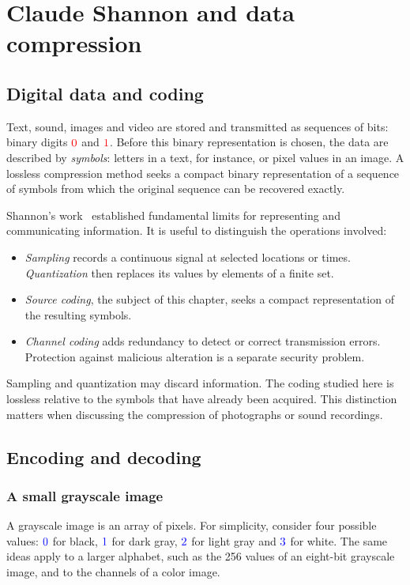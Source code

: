\chapter{Claude Shannon and data compression}
\label{chap-shannon}

\section{Digital data and coding}
Text, sound, images and video are stored and transmitted as sequences of bits: binary digits ${\color{red}{0}}$ and ${\color{red}{1}}$. Before this binary representation is chosen, the data are described by \emph{symbols}: letters in a text, for instance, or pixel values in an image. A lossless compression method seeks a compact binary representation of a sequence of symbols from which the original sequence can be recovered exactly.

Shannon's work~\cite{Shannon1948,shannon1949} established fundamental limits for representing and communicating information. It is useful to distinguish the operations involved:
\begin{itemize}
\item \emph{Sampling} records a continuous signal at selected locations or times. \emph{Quantization} then replaces its values by elements of a finite set.
\item \emph{Source coding}, the subject of this chapter, seeks a compact representation of the resulting symbols.
\item \emph{Channel coding} adds redundancy to detect or correct transmission errors. Protection against malicious alteration is a separate security problem.
\end{itemize}
Sampling and quantization may discard information. The coding studied here is lossless relative to the symbols that have already been acquired. This distinction matters when discussing the compression of photographs or sound recordings.

\section{Encoding and decoding}
\subsection{A small grayscale image}
A grayscale image is an array of pixels. For simplicity, consider four possible values: ${\color{blue}{0}}$ for black, ${\color{blue}{1}}$ for dark gray, ${\color{blue}{2}}$ for light gray and ${\color{blue}{3}}$ for white. The same ideas apply to a larger alphabet, such as the 256 values of an eight-bit grayscale image, and to the channels of a color image.

